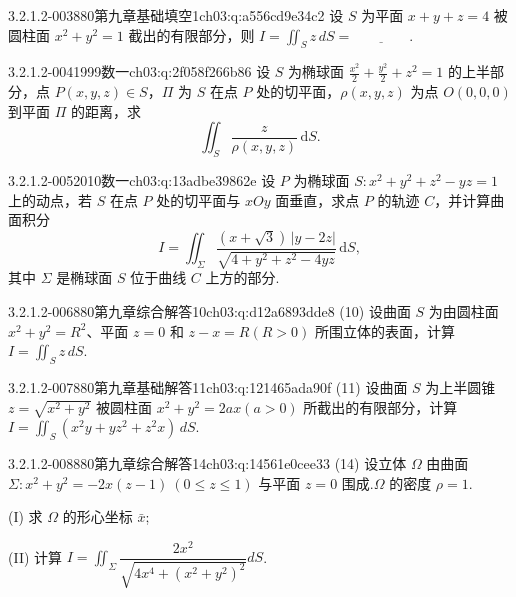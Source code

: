 \begin{q}{3.2.1.2-003}{880第九章基础填空1}{ch03:q:a556cd9e34c2}
设 $S$ 为平面 $x+y+z=4$ 被圆柱面 $x^2+y^2=1$ 截出的有限部分，则 $\displaystyle I=\iint_S z\,dS=\underline{\hspace{4em}}.$
\end{q}

\begin{q}{3.2.1.2-004}{1999数一}{ch03:q:2f058f266b86}
设 $S$ 为椭球面 $\frac{x^2}{2}+\frac{y^2}{2}+z^2=1$ 的上半部分，点 $P(x,y,z)\in S$，$\Pi$ 为 $S$ 在点 $P$ 处的切平面，$\rho(x,y,z)$ 为点 $O(0,0,0)$ 到平面 $\Pi$ 的距离，求
\[
\iint_S \frac{z}{\rho(x,y,z)}\,\mathrm{d}S.
\]
\end{q}

\begin{q}{3.2.1.2-005}{2010数一}{ch03:q:13adbe39862e}
设 $P$ 为椭球面 $S:x^2+y^2+z^2-yz=1$ 上的动点，若 $S$ 在点 $P$ 处的切平面与 $xOy$ 面垂直，求点 $P$ 的轨迹 $C$，并计算曲面积分
\[ I=\iint_{\Sigma}\frac{(x+\sqrt{3})\,|y-2z|}{\sqrt{4+y^2+z^2-4yz}}\,\mathrm{d}S, \]
其中 $\Sigma$ 是椭球面 $S$ 位于曲线 $C$ 上方的部分.
\end{q}

\begin{q}{3.2.1.2-006}{880第九章综合解答10}{ch03:q:d12a6893dde8}
(10) 设曲面 $S$ 为由圆柱面 $x^2+y^2=R^2$、平面 $z=0$ 和 $z-x=R(R>0)$ 所围立体的表面，计算 $\displaystyle I=\iint_S z\,dS$.
\end{q}

\begin{q}{3.2.1.2-007}{880第九章基础解答11}{ch03:q:121465ada90f}
(11) 设曲面 $S$ 为上半圆锥 $z=\sqrt{x^2+y^2}$ 被圆柱面 $x^2+y^2=2ax(a>0)$ 所截出的有限部分，计算 $\displaystyle I=\iint_S (x^2y+yz^2+z^2x)\,dS$.
\end{q}

\begin{q}{3.2.1.2-008}{880第九章综合解答14}{ch03:q:14561e0cee33}
(14) 设立体 $\Omega$ 由曲面 $\Sigma:x^{2}+y^{2}=-2x(z-1)\ (0\leqslant z\leqslant 1)$ 与平面 $z=0$ 围成.$\Omega$ 的密度 $\rho=1$.

(I) 求 $\Omega$ 的形心坐标 $\bar{x}$;

(II) 计算 $\displaystyle I=\iint_{\Sigma}\dfrac{2x^{2}}{\sqrt{4x^{4}+(x^{2}+y^{2})^{2}}}dS$.
\end{q}

